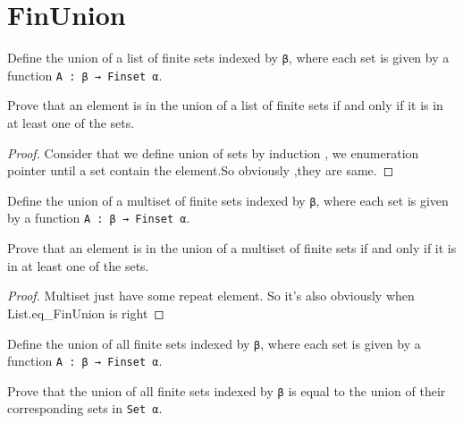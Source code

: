 \section{FinUnion}

\begin{definition}\label{List.FinUnion}
  \leanok
  Define the union of a list of finite sets indexed by \verb|β|, where each set is given by a function \verb|A : β → Finset α|.
\end{definition}

\begin{lemma}\label{List.eq_FinUnion}
  Prove that an element is in the union of a list of finite sets if and only if it is in at least one of the sets.
\end{lemma}

\begin{proof} 
  \leanok
  Consider that we define union of sets by induction , we enumeration pointer until a set contain the element.So obviously ,they are same.
\end{proof}

\begin{definition}\label{Multiset.FinUnion}
  Define the union of a multiset of finite sets indexed by \verb|β|, where each set is given by a function \verb|A : β → Finset α|.
\end{definition}

\begin{lemma}\label{Multiset.eq_FinUnion}
  Prove that an element is in the union of a multiset of finite sets if and only if it is in at least one of the sets.
\end{lemma}

\begin{proof} 
  \leanok
  Multiset just have some repeat element. So it's also obviously when List.eq_FinUnion is right
\end{proof}

\begin{definition}\label{FinUnion₀}
  Define the union of all finite sets indexed by \verb|β|, where each set is given by a function \verb|A : β → Finset α|.
\end{definition}

\begin{lemma}\label{eq_FinUnion₀}
  Prove that the union of all finite sets indexed by \verb|β| is equal to the union of their corresponding sets in \verb|Set α|.
\end{lemma}

